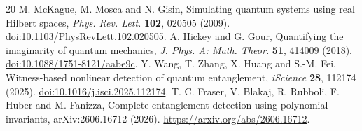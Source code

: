\documentclass[11pt,a4paper]{article}
\theoremstyle{definition}\newtheorem{definition}[theorem]{Definition}\newtheorem*{conj}{Conjecture 9 of Shen, Chen and Bian}\newtheorem{remark}[theorem]{Remark}
\begin{document}
\begin{thebibliography}{20}
 M. McKague, M. Mosca and N. Gisin, Simulating quantum systems using real Hilbert spaces, \emph{Phys. Rev. Lett.} \textbf{102}, 020505 (2009). \href{https://doi.org/10.1103/PhysRevLett.102.020505}{doi:10.1103/PhysRevLett.102.020505}.
 A. Hickey and G. Gour, Quantifying the imaginarity of quantum mechanics, \emph{J. Phys. A: Math. Theor.} \textbf{51}, 414009 (2018). \href{https://doi.org/10.1088/1751-8121/aabe9c}{doi:10.1088/1751-8121/aabe9c}.
 Y. Wang, T. Zhang, X. Huang and S.-M. Fei, Witness-based nonlinear detection of quantum entanglement, \emph{iScience} \textbf{28}, 112174 (2025). \href{https://doi.org/10.1016/j.isci.2025.112174}{doi:10.1016/j.isci.2025.112174}.
 T. C. Fraser, V. Blakaj, R. Rubboli, F. Huber and M. Fanizza, Complete entanglement detection using polynomial invariants, arXiv:2606.16712 (2026). \url{https://arxiv.org/abs/2606.16712}.
\end{thebibliography}
\end{document}
